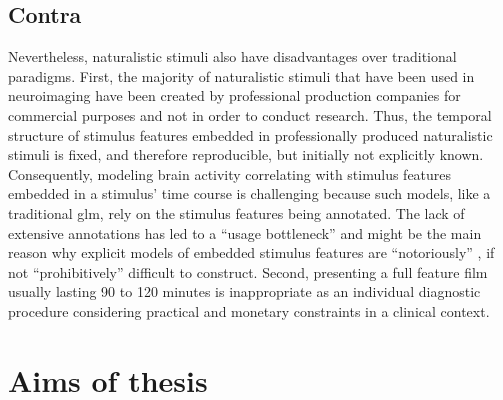 \subsection{Contra}
Nevertheless, naturalistic stimuli also have disadvantages over traditional
paradigms.
First, the majority of naturalistic stimuli that have been used in neuroimaging
have been created by professional production companies for commercial purposes
and not in order to conduct research.
Thus, the temporal structure of stimulus features embedded in professionally
produced naturalistic stimuli is fixed, and therefore reproducible, but
initially not explicitly known.
Consequently, modeling brain activity correlating with stimulus features
embedded in a stimulus' time course is challenging
\citep{saarimaki2021naturalistic, simony2020analysis} because such models, like
a traditional \ac{glm}, rely on the stimulus features being annotated.
The lack of extensive annotations has led to a ``usage bottleneck''
\citep{aliko2020naturalistic} and might be the main reason why explicit models
of embedded stimulus features are ``notoriously'' \citep{richard2019fast}, if
not ``prohibitively'' \citep{nastase2019measuring} difficult to construct.
Second, presenting a full feature film usually lasting 90 to 120 minutes is
inappropriate as an individual diagnostic procedure considering practical and
monetary constraints in a clinical context.


\section{Aims of thesis}


